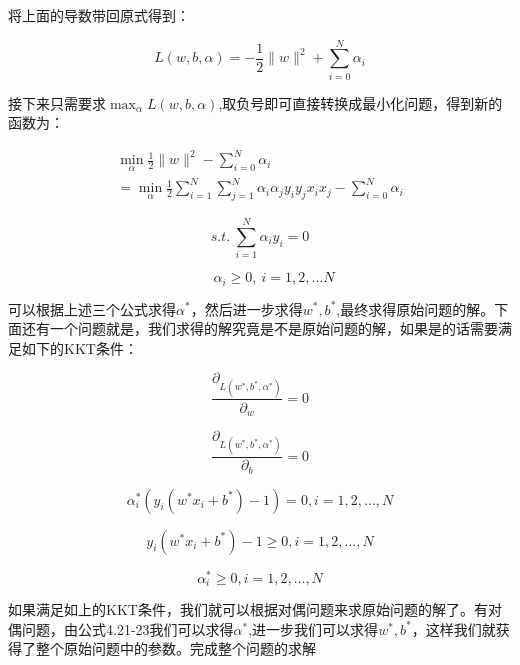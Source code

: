 	将上面的导数带回原式得到：
	
	\begin{equation}
	L(w,b,\alpha) = -\frac{1}{2}\|w\|^2 + \sum_{i=0}^{N} \alpha_i
	\end{equation}
	
	接下来只需要求$\max_{\alpha}L(w,b,\alpha)$,取负号即可直接转换成最小化问题，得到新的函数为：

    \begin{gather}
	\min_{\alpha} \frac{1}{2}\|w\|^2 - \sum_{i=0}^{N} \alpha_i \\ \nonumber
	=\min_{\alpha} \frac{1}{2}\sum_{i=1}^{N}\sum_{j=1}^{N}\alpha_i \alpha_j y_i y_j x_i x_j - \sum_{i=0}^{N} \alpha_i
	\end{gather}
	
	\begin{equation}
	s.t.\ \sum_{i=1}^{N} \alpha_i y_i = 0
	\end{equation}
	
	\begin{equation}
	\qquad \alpha_i \geq 0, \ i=1,2,...N
	\end{equation}
	
	可以根据上述三个公式求得$\alpha^*$，然后进一步求得$w^*,b^*$,最终求得原始问题的解。下面还有一个问题就是，我们求得的解究竟是不是原始问题的解，如果是的话需要满足如下的KKT条件：
	
	\begin{equation}
		\frac{\partial_{L(w^*,b^*,\alpha^*)}}{\partial_w} = 0
	\end{equation}

	\begin{equation}
		\frac{\partial_{L(w^*,b^*,\alpha^*)}}{\partial_b} = 0
	\end{equation}
	
	\begin{equation}
		\alpha_i^*(y_i(w^*x_i+b^*)-1)=0,i=1,2,...,N
	\end{equation}
	
	\begin{equation}
		y_i(w^*x_i+b^*)-1 \geq 0,i=1,2,...,N
	\end{equation}
	
	\begin{equation}
		\alpha_i^* \geq 0,i=1,2,...,N
	\end{equation}
	
	如果满足如上的KKT条件，我们就可以根据对偶问题来求原始问题的解了。有对偶问题，由公式4.21-23我们可以求得$\alpha^*$,进一步我们可以求得$w^*,b^*$，这样我们就获得了整个原始问题中的参数。完成整个问题的求解
	
